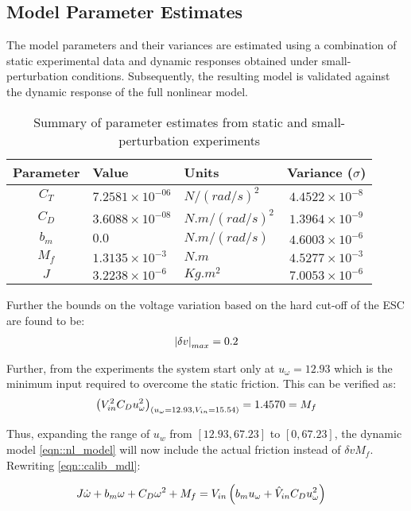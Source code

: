 \subsection{Model Parameter Estimates}
The model parameters and their variances are estimated using a combination of static experimental data and dynamic responses obtained under small-perturbation conditions. Subsequently, the resulting model is validated against the dynamic response of the full nonlinear model.
\begin{table}[h]
    \centering
    \begin{tabular}{c l l c}
        \hline \hline
        Parameter & Value & Units & Variance ($\sigma$)            \\ \hline \hline
        $C_T$ & $7.2581 \times 10^{-06}$ & $N/(rad/s)^2$   & $4.4522 \times 10^{-8}$ \\
        $C_D$ & $3.6088 \times 10^{-08}$ & $N.m/(rad/s)^2$ & $1.3964 \times 10^{-9}$ \\
        $b_m$ & $0.0$                    & $N.m/(rad/s)$   & $4.6003 \times 10^{-6}$  \\
        $M_f$ & $1.3135 \times 10^{-3}$  & $N.m$           & $4.5277 \times 10^{-3}$ \\
        $J$   & $3.2238 \times 10^{-6}$   & $Kg.m^2$        & $7.0053 \times 10^{-6}$ \\
        \hline \hline
    \end{tabular}
    \caption{Summary of parameter estimates from static and small-perturbation experiments}
    \label{tab::parm_ests}
\end{table}

Further the bounds on the voltage variation based on the hard cut-off of the ESC
are found to be:
\begin{align}
\left\lvert \delta v \right\rvert_{max} = 0.2
\end{align}

Further, from the experiments the system start only at $u_\omega = 12.93$ which
is the minimum input required to overcome the static friction. This can be
verified as:
\begin{align}
     \left( V_{in}^2  C_D u_\omega^2  \right)_{\left( u_\omega = 12.93, V_{in} = 15.54 \right)} = 1.4570 =  M_f
\end{align}

Thus, expanding the range of $u_w$ from $[12.93, 67.23]$ to $[0, 67.23]$, the
dynamic model \ref{eqn::nl_model} will now include the actual friction instead
of $\delta v M_f$. Rewriting \ref{eqn::calib_mdl}:

\begin{align}
    &J \dot \omega + b_m \omega + C_D \omega^2 + M_f = V_{in} \left( b_m u_\omega + \hat V_{in} C_D u_\omega^2 \right)
    \label{eqn::0_mdl}
\end{align}
